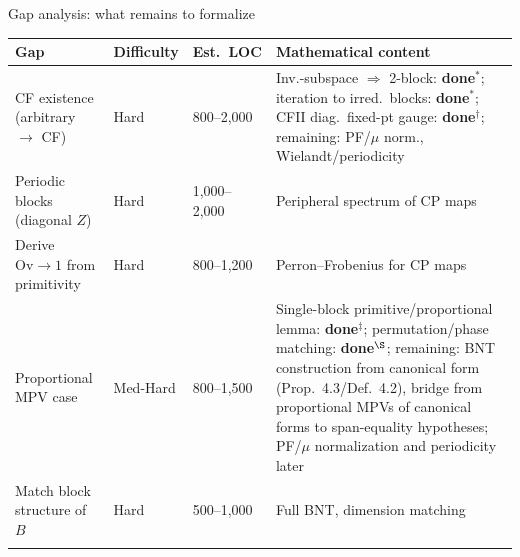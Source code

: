 \documentclass[aspectratio=169,10pt]{beamer}
\newcommand{\Ov}{\mathrm{Ov}}
\begin{document}
\begin{frame}{Gap analysis: what remains to formalize}
    \vspace{-0.7em}

    \renewcommand{\arraystretch}{1.1}
    {\footnotesize
        \begin{tabular}{p{} p{} p{} p{}}
            \toprule
            \textbf{Gap} & \textbf{Difficulty} & \textbf{Est.\ LOC} & \textbf{Mathematical content}                 \\
            \midrule
            \rowcolor{cardbg}
            CF existence (arbitrary $\to$ CF)
                         & Hard                & 800--2{,}000
                         & Inv.-subspace $\Rightarrow$ 2-block: \textcolor{leangreen}{\textbf{done}}$^*$;
                           iteration to irred.\ blocks: \textcolor{leangreen}{\textbf{done}}$^*$;
                           CFII diag.\ fixed-pt gauge: \textcolor{leangreen}{\textbf{done}}$^{\dagger}$;
                           remaining: PF/$\mu$ norm., Wielandt/periodicity \\
            \rowcolor{cardbg}
            Periodic blocks (diagonal $Z$)
                         & Hard                & 1{,}000--2{,}000   & Peripheral spectrum of CP maps                \\
            \rowcolor{cardbg}
            Derive $\Ov\to 1$ from primitivity
                         & Hard                & 800--1{,}200       & Perron--Frobenius for CP maps                 \\
            \rowcolor{cardbg}
            Proportional MPV case
                         & Med-Hard            & 800--1{,}500
                         & Single-block primitive/proportional lemma:
                           \textcolor{leangreen}{\textbf{done}}$^{\ddagger}$;
                           permutation/phase matching:
                           \textcolor{leangreen}{\textbf{done}}$^{\S}$;
                           remaining: BNT construction from canonical form
                           (Prop.~4.3/Def.~4.2), bridge from proportional MPVs of
                           canonical forms to span-equality hypotheses;
                           PF/$\mu$ normalization and periodicity later \\
            \rowcolor{cardbg}
            Match block structure of $B$
                         & Hard                & 500--1{,}000       & Full BNT, dimension matching                  \\
            \rowcolor{cardbg}

\end{tabular}}
\end{frame}
\end{document}
